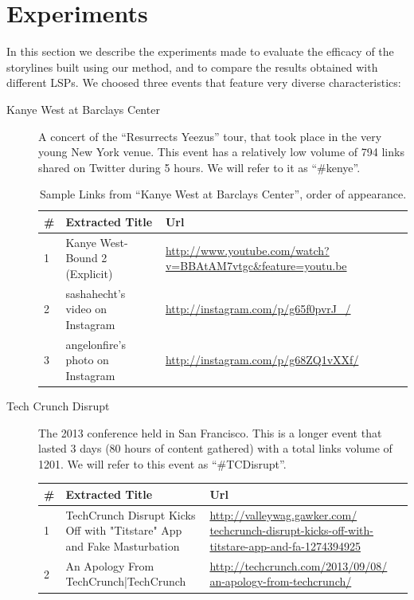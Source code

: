 \documentclass{sig-alternate}
\begin{document}
\section{Experiments}
\label{sec:experiments}
In this section we describe the experiments made to evaluate the efficacy of the storylines built using our method, and to compare the results obtained with different LSPs. We choosed three events that feature very diverse characteristics:
\begin{description}
\item[Kanye West at Barclays Center] A concert of the ``Resurrects Yeezus'' tour, that took place in the very young New York venue. This event has a relatively low volume of 794 links shared on Twitter during 5 hours. We will refer to it as ``\#kenye''.
\begin{table}
\begin{tabular}{| p{0.5cm} | p{2cm} | p{5cm} |}
  \hline
  \textbf{\#} & \textbf{Extracted Title} & \textbf{Url} \\
  \hline
  1 & Kanye West-Bound 2 (Explicit) & \url{http://www.youtube.com/watch?v=BBAtAM7vtgc\&feature=youtu.be} \\
\hline
  2 & sashahecht's video on Instagram & \url{http://instagram.com/p/g65f0pvrJ\_/} \\
\hline
  3 & angelonfire's photo on Instagram & \url{http://instagram.com/p/g68ZQ1vXXf/} \\
\hline
\end{tabular}
\caption{Sample Links from ``Kanye West at Barclays Center'', order of appearance.}
\label{table:kanye}
\end{table}
\item[Tech Crunch Disrupt] The 2013 conference held in San Francisco. This is a longer event that lasted 3 days (80 hours of content gathered) with a total links volume of 1201. We will refer to this event as ``\#TCDisrupt''.
\begin{table}
\begin{tabular}{| p{0.5cm} | p{2cm} | p{5cm} |}
  \hline
  \textbf{\#} & \textbf{Extracted Title} & \textbf{Url} \\
  \hline
  1 & TechCrunch Disrupt Kicks Off with "Titstare" App and Fake Masturbation & \url{http://valleywag.gawker.com/ techcrunch-disrupt-kicks-off-with-titstare-app-and-fa-1274394925} \\
\hline
  2 & An Apology From TechCrunch|TechCrunch & \url{http://techcrunch.com/2013/09/08/ an-apology-from-techcrunch/} \\
\hline

\end{tabular}
\end{table}
\end{description}
\end{document}
